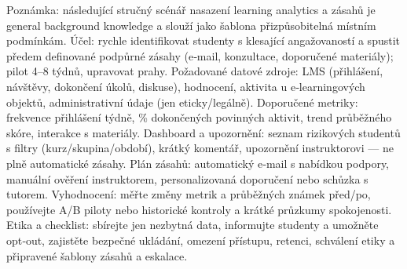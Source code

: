 \noindent Poznámka: následující stručný scénář nasazení learning analytics a zásahů je general background knowledge a slouží jako šablona přizpůsobitelná místním podmínkám.
\noindent Účel: rychle identifikovat studenty s klesající angažovaností a spustit předem definované podpůrné zásahy (e‑mail, konzultace, doporučené materiály); pilot 4–8 týdnů, upravovat prahy.
\noindent Požadované datové zdroje: LMS (přihlášení, návštěvy, dokončení úkolů, diskuse), hodnocení, aktivita u e‑learningových objektů, administrativní údaje (jen eticky/legálně).
\noindent Doporučené metriky: frekvence přihlášení týdně, \% dokončených povinných aktivit, trend průběžného skóre, interakce s materiály.
\noindent Dashboard a upozornění: seznam rizikových studentů s filtry (kurz/skupina/období), krátký komentář, upozornění instruktorovi — ne plně automatické zásahy.
\noindent Plán zásahů: automatický e‑mail s nabídkou podpory, manuální ověření instruktorem, personalizovaná doporučení nebo schůzka s tutorem.
\noindent Vyhodnocení: měřte změny metrik a průběžných známek před/po, používejte A/B piloty nebo historické kontroly a krátké průzkumy spokojenosti.
\noindent Etika a checklist: sbírejte jen nezbytná data, informujte studenty a umožněte opt‑out, zajistěte bezpečné ukládání, omezení přístupu, retenci, schválení etiky a připravené šablony zásahů a eskalace.